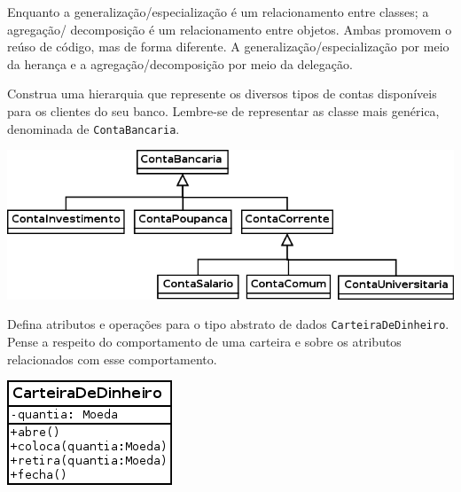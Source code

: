 \documentclass[12pt]{exam}
\begin{document}
\begin{questions}
\begin{solution}
      Enquanto a generalização/especialização é um relacionamento entre classes; a agregação/ decomposição é um relacionamento entre objetos. Ambas promovem o reúso de código, mas de forma diferente. A generalização/especialização por meio da herança e a agregação/decomposição por meio da delegação.
      
      
    \end{solution}
    
    \question 
      Construa uma hierarquia que represente os diversos tipos de contas disponíveis para os clientes do seu banco. Lembre-se
      de representar as classe mais genérica, denominada de \verb!ContaBancaria!.
      \begin{solution}
	\begin{center}
	  \includegraphics[width=.7\textwidth]{./exercicios-capitulo1-e3.png}
	\end{center}
      \end{solution}    
    
    \question 
      Defina atributos e operações para o tipo abstrato de dados \verb!CarteiraDeDinheiro!. Pense a respeito do comportamento de uma
      carteira e sobre os atributos relacionados com esse comportamento.
      \begin{solution}
	\begin{center}
	  \includegraphics[width=.6\textwidth]{./exercicios-capitulo1-e4.png}
	\end{center}
      \end{solution}


\end{questions}
\end{document}
